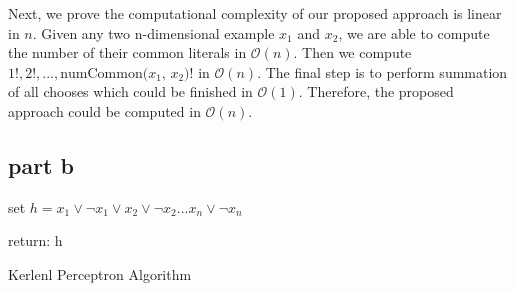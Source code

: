 Next, we prove the computational complexity of our proposed approach is linear in $n$. Given any two n-dimensional example $x_1$ and $x_2$, we are able to compute the number of their common literals in $\mathcal{O}(n)$. Then we compute $1!, 2!, ..., \text{numCommon($x_1$, $x_2$)}!$ in $\mathcal{O}(n)$. The final step is to perform summation of all chooses which could be finished in $\mathcal{O}(1)$. Therefore, the proposed approach could be computed in $\mathcal{O}(n)$.


\subsection{part b}
\begin{algorithm}[H]
  set $h = x_1 \vee \neg x_1 \vee x_2 \vee \neg x_2 ... x_n \vee \neg x_n$\;


return: h\;

 \caption{Kerlenl Perceptron Algorithm}
\end{algorithm}












